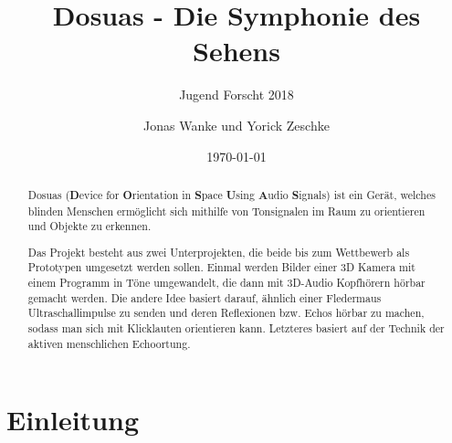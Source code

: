 \documentclass[a4paper,12pt,ngerman]{scrartcl}
\title{Dosuas - Die Symphonie des Sehens}
\subtitle{Jugend Forscht 2018}
\author{Jonas Wanke und Yorick Zeschke}
\date{\today}
\begin{document}
\maketitle


\begin{abstract}
	Dosuas (\textbf{D}evice for \textbf{O}rientation in \textbf{S}pace \textbf{U}sing 
	\textbf{A}udio \textbf{S}ignals) ist ein Gerät, welches blinden Menschen ermöglicht
	sich mithilfe von Tonsignalen im Raum zu orientieren und Objekte zu erkennen.\par
	Das Projekt besteht aus zwei Unterprojekten, die beide bis zum 
	Wettbewerb als Prototypen umgesetzt werden sollen. Einmal werden Bilder einer 3D Kamera
	mit einem Programm in Töne umgewandelt, die dann mit 3D-Audio Kopfhörern hörbar gemacht
	werden. Die andere Idee basiert darauf, ähnlich einer Fledermaus Ultraschallimpulse 
	zu senden und deren Reflexionen bzw. Echos hörbar zu machen, sodass man
	sich mit Klicklauten orientieren kann. Letzteres basiert auf der Technik der aktiven
	menschlichen Echoortung.
\end{abstract}

\tableofcontents

\newpage

\section{Einleitung}
\end{document}
